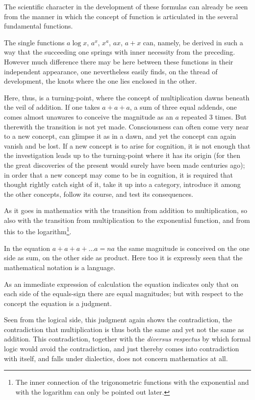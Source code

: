 \documentclass[12pt]{book}
\begin{document}
The scientific character in the development of these formulas can already be seen
from the manner in which the concept of function is articulated in the several
fundamental functions.

The single functions $a\log x$, $a^{x}$, $x^{a}$, $ax$, $a+x$ can, namely, be
derived in such a way that the succeeding one springs with inner necessity from
the preceding. However much difference there may be here between these functions
in their independent appearance, one nevertheless easily finds, on the thread of
development, the knots where the one lies enclosed in the other.

Here, thus, is a turning-point, where the concept of multiplication dawns beneath
the veil of addition. If one takes $a+a+a$, a sum of three equal addends, one
comes almost unawares to conceive the magnitude as an $a$ repeated 3 times. But
therewith the transition is not yet made. Consciousness can often come very near
to a new concept, can glimpse it as in a dawn, and yet the concept can again
vanish and be lost.
If a new concept is to arise for cognition, it is not enough that the
investigation leads up to the turning-point where it has its origin (for then the
great discoveries of the present would surely have been made centuries ago); in
order that a new concept may come to be in cognition, it is required that thought
rightly catch sight of it, take it up into a category, introduce it among the
other concepts, follow its course, and test its consequences.

As it goes in mathematics with the transition from addition to multiplication, so
also with the transition from multiplication to the exponential function, and
from this to the logarithm\footnote{The inner connection of the trigonometric
functions with the exponential and with the logarithm can only be pointed out
later.}.

In the equation $a+a+a+\dots a = na$ the same magnitude is conceived on the one
side as sum, on the other side as product. Here too it is expressly seen that the
mathematical notation is a language.

As an immediate expression of calculation the equation indicates only that on
each side of the equals-sign there are equal magnitudes; but with respect to the
concept the equation is a judgment.

Seen from the logical side, this judgment again shows the contradiction, the
contradiction that multiplication is thus both the same and yet not the same as
addition. This contradiction, together with the \textit{diversus respectus} by
which formal logic would avoid the contradiction, and just thereby comes into
contradiction with itself, and falls under dialectics, does not concern
mathematics at all.
\end{document}
